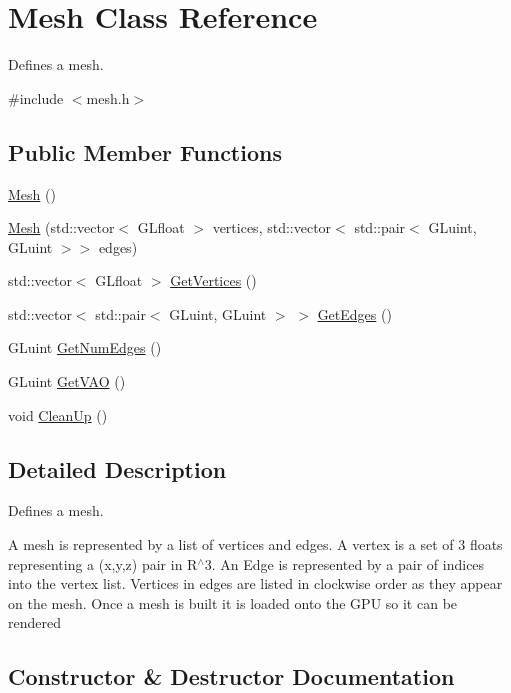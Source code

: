 \hypertarget{classMesh}{}\section{Mesh Class Reference}
\label{classMesh}


Defines a mesh.  




{\ttfamily \#include $<$mesh.\+h$>$}

\subsection*{Public Member Functions}
\begin{DoxyCompactItemize}
\item 
\hyperlink{classMesh_a2af137f1571af89172b9c102302c416b}{Mesh} ()
\item 
\hyperlink{classMesh_acca57d57a35d834a9ba0fa0290a4d121}{Mesh} (std\+::vector$<$ G\+Lfloat $>$ vertices, std\+::vector$<$ std\+::pair$<$ G\+Luint, G\+Luint $>$$>$ edges)
\item 
std\+::vector$<$ G\+Lfloat $>$ \hyperlink{classMesh_aad4e49df1b12331d688d677f997360a5}{Get\+Vertices} ()
\item 
std\+::vector$<$ std\+::pair$<$ G\+Luint, G\+Luint $>$ $>$ \hyperlink{classMesh_a4c31bac7ef0c5552e8dc692a33726ca3}{Get\+Edges} ()
\item 
G\+Luint \hyperlink{classMesh_adbbf05c59fd7cc170ceca2a0a71d7af1}{Get\+Num\+Edges} ()
\item 
G\+Luint \hyperlink{classMesh_ad4917bc56c71f31974af4be3eb90a390}{Get\+V\+AO} ()
\item 
void \hyperlink{classMesh_abe1f7ce31904fb28cef0c156b892af8e}{Clean\+Up} ()
\end{DoxyCompactItemize}


\subsection{Detailed Description}
Defines a mesh. 

A mesh is represented by a list of vertices and edges. A vertex is a set of 3 floats representing a (x,y,z) pair in R$^\wedge$3. An Edge is represented by a pair of indices into the vertex list. Vertices in edges are listed in clockwise order as they appear on the mesh. Once a mesh is built it is loaded onto the G\+PU so it can be rendered 

\subsection{Constructor \& Destructor Documentation}
\mbox{\label{classMesh_a2af137f1571af89172b9c102302c416b}} 

